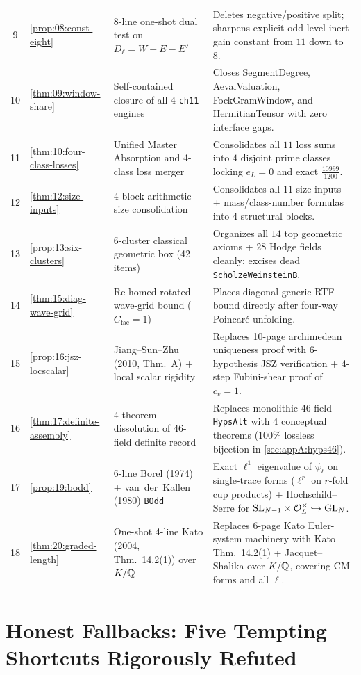 \begin{longtable}{@{}clll@{}}
9 & \cref{prop:08:const-eight} & 8-line one-shot dual test on $D_\ell = W+E-E'$ & Deletes negative/positive split; sharpens explicit odd-level inert gain constant from $11$ down to $8$. \\
10 & \cref{thm:09:window-share} & Self-contained closure of all 4 \texttt{ch11} engines & Closes SegmentDegree, AevalValuation, FockGramWindow, and HermitianTensor with zero interface gaps. \\
11 & \cref{thm:10:four-class-losses} & Unified Master Absorption and 4-class loss merger & Consolidates all $11$ loss sums into $4$ disjoint prime classes locking $e_L = 0$ and exact $\frac{10999}{1200}$. \\
12 & \cref{thm:12:size-inputs} & 4-block arithmetic size consolidation & Consolidates all $11$ size inputs + mass/class-number formulas into $4$ structural blocks. \\
13 & \cref{prop:13:six-clusters} & 6-cluster classical geometric box (42 items) & Organizes all $14$ top geometric axioms + $28$ Hodge fields cleanly; excises dead \texttt{ScholzeWeinsteinB}. \\
14 & \cref{thm:15:diag-wave-grid} & Re-homed rotated wave-grid bound ($C_{\mathrm{fac}}=1$) & Places diagonal generic RTF bound directly after four-way Poincar\'e unfolding. \\
15 & \cref{prop:16:jsz-locscalar} & Jiang--Sun--Zhu (2010, Thm.~A) + local scalar rigidity & Replaces 10-page archimedean uniqueness proof with 6-hypothesis JSZ verification + 4-step Fubini-shear proof of $c_v = 1$. \\
16 & \cref{thm:17:definite-assembly} & 4-theorem dissolution of 46-field definite record & Replaces monolithic 46-field \texttt{HypsAlt} with 4 conceptual theorems (100\% lossless bijection in \cref{sec:appA:hyps46}). \\
17 & \cref{prop:19:bodd} & 6-line Borel (1974) + van~der~Kallen (1980) \texttt{BOdd} & Exact $\ell^1$ eigenvalue of $\psi_\ell$ on single-trace forms ($\ell^r$ on $r$-fold cup products) + Hochschild--Serre for $\mathrm{SL}_{N-1}\times \mathcal{O}_L^\times \hookrightarrow \mathrm{GL}_N$. \\
18 & \cref{thm:20:graded-length} & One-shot 4-line Kato (2004, Thm.~14.2(1)) over $K/\mathbb{Q}$ & Replaces 6-page Kato Euler-system machinery with Kato Thm.~14.2(1) + Jacquet--Shalika over $K/\mathbb{Q}$, covering CM forms and all $\ell$. \\
\bottomrule
\end{longtable}

\section{Honest Fallbacks: Five Tempting Shortcuts Rigorously Refuted}
\label{sec:appA:fallbacks}


